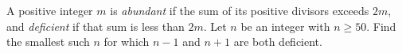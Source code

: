 A positive integer $m$ is \emph{abundant} if the sum of its positive divisors exceeds $2m$, and \emph{deficient} if that sum is less than $2m$. Let $n$ be an integer with $n\ge50$. Find the smallest such $n$ for which $n-1$ and $n+1$ are both deficient.
